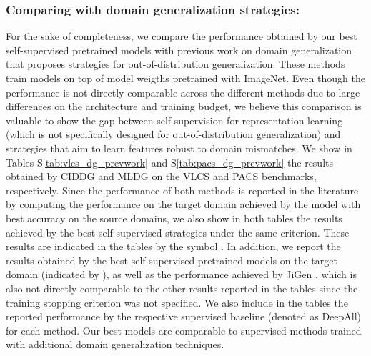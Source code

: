 \documentclass[runningheads]{llncs}
\begin{document}
\subsubsection*{Comparing with domain generalization strategies:} For the sake of completeness, we compare the performance obtained by our best self-supervised pretrained models with previous work on domain generalization that proposes strategies for out-of-distribution generalization. These methods train models on top of model weigths pretrained with ImageNet. Even though the performance is not directly comparable across the different methods due to large differences on the architecture and training budget, we believe this comparison is valuable to show the gap between self-supervision for representation learning (which is not specifically designed for out-of-distribution generalization) and strategies that aim  to learn features robust to domain mismatches. We show in Tables S\ref{tab:vlcs_dg_prevwork} and  S\ref{tab:pacs_dg_prevwork} the results obtained by CIDDG \cite{li2018domain} and MLDG \cite{li2018learning} on the VLCS and PACS benchmarks, respectively. Since the  performance of both methods is reported in the literature by computing the performance on the target domain achieved by the model with best accuracy on the source domains, we also show in both tables the results achieved by the best self-supervised strategies under the same criterion. These results are indicated in the tables by the symbol . In addition, we  report the results obtained by the best self-supervised pretrained models on the target domain (indicated by ), as well as the performance achieved by JiGen \cite{carlucci2019domain}, which is also not directly comparable to the other results reported in the tables since the training stopping criterion was not specified. We also include in the tables the reported performance by the respective supervised baseline (denoted as DeepAll) for each method. Our best models are comparable to supervised methods trained with additional domain generalization techniques. 
\end{document}
